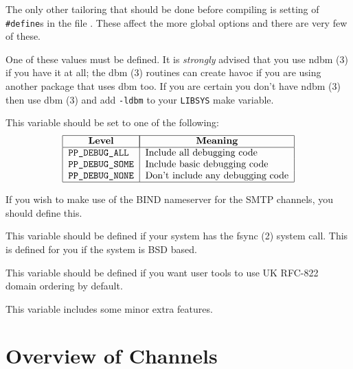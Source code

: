 The only other tailoring that should be done before compiling is
setting of \verb+#define+s in the file . These affect the
more global options and there are very few of these.

\begin{describe}
\item[\verb+DBM+/\verb+NDBM+:]
One of these values must be defined.
It is {\em strongly} advised that you use \man ndbm (3) if you have it
at all; the \man dbm (3) routines can create havoc if you are using
another package that uses dbm too.  If you are certain you don't have
\man ndbm (3) then use \man dbm (3) and add \verb+-ldbm+ to your
\verb+LIBSYS+ make variable.

\item[\verb+PP\_DEBUG+:] This variable should be set to one of the following:
\[\begin{tabular}{|l | l|}
\hline
	\multicolumn{1}{|c|}{\bf Level} & \multicolumn{1}{|c|}{\bf Meaning}\\
\hline
	\tt PP\_DEBUG\_ALL&	Include all debugging code\\
	\tt PP\_DEBUG\_SOME&	Include basic debugging code\\
	\tt PP\_DEBUG\_NONE&	Don't include any debugging code\\
\hline
\end{tabular}\]

\item[\verb+NAMESERVER+:] If you wish to make use of
the BIND nameserver for the SMTP channels, you should define this.

\item[\verb+HAS\_FSYNC+:]
This variable should be defined if your
system has the \man fsync (2) system call. This is defined for you if
the system is BSD based.

\item[\verb+UKORDER+:] 
This variable should be defined if you want user tools to use UK
RFC-822 domain ordering by default.

\item[\verb|VAT|:]
This variable includes some minor extra features.
\end{describe}

\section {Overview of Channels}

